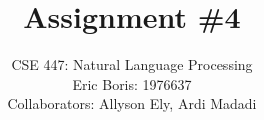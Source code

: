 \title{Assignment \#4} 
\author{\normalsize{CSE 447: Natural Language Processing}\\ 
\normalsize{Eric Boris: 1976637}\\
\normalsize{Collaborators: Allyson Ely, Ardi Madadi}}
\maketitle
